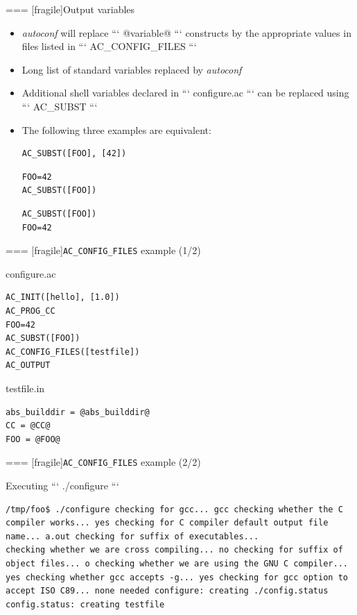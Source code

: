 === [fragile]{Output variables}
  \begin{itemize}
  \item {\em autoconf} will replace ``` @variable@ ``` constructs by
    the appropriate values in files listed in ``` AC_CONFIG_FILES ```
  \item Long list of standard variables replaced by {\em autoconf}
  \item Additional shell variables declared in ``` configure.ac ``` can
    be replaced using ``` AC_SUBST ```
  \item The following three examples are equivalent:
    \begin{block}{}
\begin{verbatim}
AC_SUBST([FOO], [42])
\end{verbatim}
    \end{block}

    \begin{block}{}
\begin{verbatim}
FOO=42
AC_SUBST([FOO])
\end{verbatim}
    \end{block}

    \begin{block}{}
\begin{verbatim}
AC_SUBST([FOO])
FOO=42
\end{verbatim}
    \end{block}

  \end{itemize}


=== [fragile]{{\tt AC\_CONFIG\_FILES} example (1/2)}

\begin{block}{configure.ac}
\begin{verbatim}
AC_INIT([hello], [1.0])
AC_PROG_CC
FOO=42
AC_SUBST([FOO])
AC_CONFIG_FILES([testfile])
AC_OUTPUT
\end{verbatim}
\end{block}

\begin{block}{testfile.in}
\begin{verbatim}
abs_builddir = @abs_builddir@
CC = @CC@
FOO = @FOO@
\end{verbatim}
\end{block}



=== [fragile]{{\tt AC\_CONFIG\_FILES} example (2/2)}

\begin{block}{Executing ``` ./configure ```}
\begin{verbatim}
/tmp/foo$ ./configure checking for gcc... gcc checking whether the C compiler works... yes checking for C compiler default output file name... a.out checking for suffix of executables... 
checking whether we are cross compiling... no checking for suffix of object files... o checking whether we are using the GNU C compiler... yes checking whether gcc accepts -g... yes checking for gcc option to accept ISO C89... none needed configure: creating ./config.status config.status: creating testfile
\end{verbatim}
\end{block}

